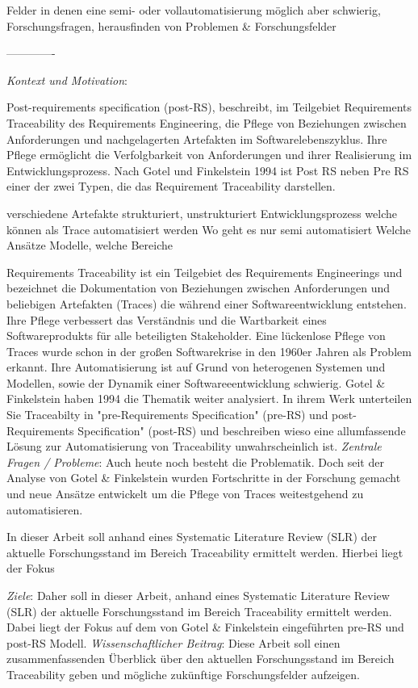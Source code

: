


Felder in denen eine semi- oder vollautomatisierung möglich aber schwierig, Forschungsfragen, herausfinden von Problemen & Forschungsfelder

-------------

\textit{Kontext und Motivation}:

Post-requirements specification (post-RS), beschreibt, im Teilgebiet Requirements Traceability des Requirements Engineering, die Pflege von Beziehungen zwischen Anforderungen und nachgelagerten Artefakten im Softwarelebenszyklus. Ihre Pflege ermöglicht die Verfolgbarkeit von Anforderungen und ihrer Realisierung im Entwicklungsprozess. Nach Gotel und Finkelstein 1994 ist Post RS neben Pre RS einer der zwei Typen, die das Requirement Traceability darstellen.  

verschiedene Artefakte strukturiert, unstrukturiert
Entwicklungsprozess
welche können als Trace automatisiert werden
Wo geht es nur semi automatisiert
Welche Ansätze Modelle, welche Bereiche

Requirements Traceability ist ein Teilgebiet des Requirements Engineerings und bezeichnet die Dokumentation von Beziehungen zwischen Anforderungen und beliebigen Artefakten (Traces) die während einer Softwareentwicklung entstehen. Ihre Pflege verbessert das Verständnis und die Wartbarkeit eines Softwareprodukts für alle beteiligten Stakeholder. Eine lückenlose Pflege von Traces wurde schon in der großen Softwarekrise in den 1960er Jahren als Problem erkannt. Ihre Automatisierung ist auf Grund von heterogenen Systemen und Modellen, sowie der Dynamik einer Softwareeentwicklung schwierig. Gotel \& Finkelstein haben 1994 die Thematik weiter analysiert. In ihrem Werk unterteilen Sie Traceabilty in "pre-Requirements Specification" (pre-RS) und post-Requirements Specification" (post-RS) und beschreiben wieso eine allumfassende Lösung zur Automatisierung von Traceability unwahrscheinlich ist. \textit{Zentrale Fragen / Probleme}: Auch heute noch besteht die Problematik. Doch seit der Analyse von Gotel \& Finkelstein wurden Fortschritte in der Forschung gemacht und neue Ansätze entwickelt um die Pflege von Traces weitestgehend zu automatisieren.  

In dieser Arbeit soll anhand eines Systematic Literature Review (SLR) der aktuelle Forschungsstand im Bereich Traceability ermittelt werden. Hierbei liegt der Fokus

\textit{Ziele}: Daher soll in dieser Arbeit, anhand eines Systematic Literature Review (SLR) der aktuelle Forschungsstand im Bereich Traceability ermittelt werden. Dabei liegt der Fokus auf dem von Gotel \& Finkelstein eingeführten pre-RS und post-RS Modell. \textit{Wissenschaftlicher Beitrag}: Diese Arbeit soll einen zusammenfassenden Überblick über den aktuellen Forschungsstand im Bereich Traceability geben und mögliche zukünftige Forschungsfelder aufzeigen.